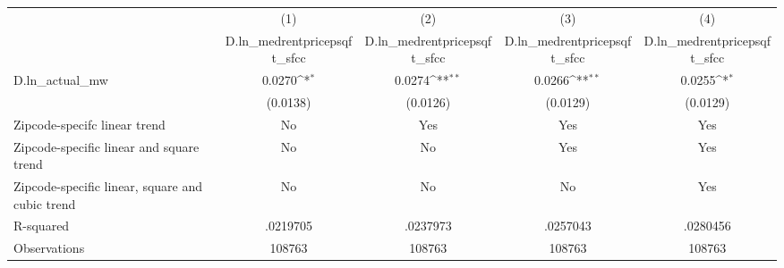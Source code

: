 {
\def\sym#1{\ifmmode^{#1}\else\(^{#1}\)\fi}
\begin{tabular}{l*{4}{c}}
\hline\hline
          &\multicolumn{1}{c}{(1)}&\multicolumn{1}{c}{(2)}&\multicolumn{1}{c}{(3)}&\multicolumn{1}{c}{(4)}\\
          &\multicolumn{1}{c}{D.ln\_medrentpricepsqft\_sfcc}&\multicolumn{1}{c}{D.ln\_medrentpricepsqft\_sfcc}&\multicolumn{1}{c}{D.ln\_medrentpricepsqft\_sfcc}&\multicolumn{1}{c}{D.ln\_medrentpricepsqft\_sfcc}\\
\hline
D.ln\_actual\_mw&   0.0270\sym{*}  &   0.0274\sym{**} &   0.0266\sym{**} &   0.0255\sym{*}  \\
          & (0.0138)         & (0.0126)         & (0.0129)         & (0.0129)         \\
\hline
Zipcode-specifc linear trend&       No         &      Yes         &      Yes         &      Yes         \\
Zipcode-specific linear and square trend&       No         &       No         &      Yes         &      Yes         \\
Zipcode-specific linear, square and cubic trend&       No         &       No         &       No         &      Yes         \\
R-squared & .0219705         & .0237973         & .0257043         & .0280456         \\
Observations&   108763         &   108763         &   108763         &   108763         \\
\hline\hline
\end{tabular}
}
